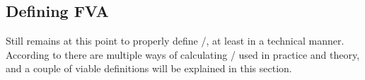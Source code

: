 \documentclass[../main.tex]{subfiles}
\begin{document}
    \subsection{Defining FVA}
        Still remains at this point to properly define \FVA/, at least in a technical manner.
        According to \cite{ADS2019} there are multiple ways of calculating \FVA/ used in practice and theory,
        and a couple of viable definitions will be explained in this section.
\end{document}
